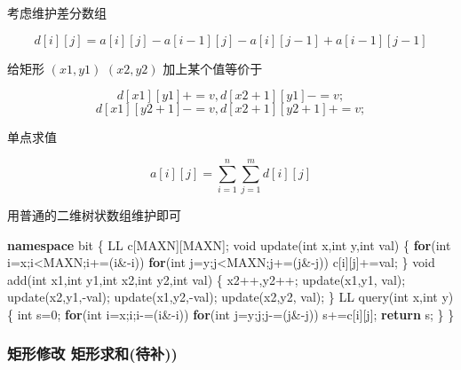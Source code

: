 \documentclass[
]{article}
\newenvironment{Shaded}{}{}
\newcommand{\ControlFlowTok}[1]{\textcolor[rgb]{0.00,0.44,0.13}{\textbf{#1}}}
\newcommand{\DataTypeTok}[1]{\textcolor[rgb]{0.56,0.13,0.00}{#1}}
\newcommand{\DecValTok}[1]{\textcolor[rgb]{0.25,0.63,0.44}{#1}}
\newcommand{\KeywordTok}[1]{\textcolor[rgb]{0.00,0.44,0.13}{\textbf{#1}}}
\newcommand{\NormalTok}[1]{#1}
\begin{document}
考虑维护差分数组

\[
d[i][j]=a[i][j]-a[i-1][j]-a[i][j-1]+a[i-1][j-1]
\]

给矩形 \((x1,y1)\) \((x2,y2)\) 加上某个值等价于

\[d[x1][y1]+=v,d[x2+1][y1]-=v;\] \[d[x1][y2+1]-=v,d[x2+1][y2+1]+=v;\]

单点求值

\[a[i][j]=\sum_{i=1}^{n}\sum_{j=1}^{m}d[i][j]\]

用普通的二维树状数组维护即可

\begin{Shaded}
\begin{Highlighting}[]
\KeywordTok{namespace}\NormalTok{ bit}
\NormalTok{\{}
\NormalTok{    LL c[MAXN][MAXN];}
    \DataTypeTok{void}\NormalTok{ update(}\DataTypeTok{int}\NormalTok{ x,}\DataTypeTok{int}\NormalTok{ y,}\DataTypeTok{int}\NormalTok{ val)}
\NormalTok{    \{}
        \ControlFlowTok{for}\NormalTok{(}\DataTypeTok{int}\NormalTok{ i=x;i\textless{}MAXN;i+=(i\&{-}i))}
            \ControlFlowTok{for}\NormalTok{(}\DataTypeTok{int}\NormalTok{ j=y;j\textless{}MAXN;j+=(j\&{-}j))}
\NormalTok{                c[i][j]+=val;}
\NormalTok{    \}}
    \DataTypeTok{void}\NormalTok{ add(}\DataTypeTok{int}\NormalTok{ x1,}\DataTypeTok{int}\NormalTok{ y1,}\DataTypeTok{int}\NormalTok{ x2,}\DataTypeTok{int}\NormalTok{ y2,}\DataTypeTok{int}\NormalTok{ val)}
\NormalTok{    \{}
\NormalTok{        x2++,y2++;}
\NormalTok{        update(x1,y1, val);}
\NormalTok{        update(x2,y1,{-}val);}
\NormalTok{        update(x1,y2,{-}val);}
\NormalTok{        update(x2,y2, val);}
\NormalTok{    \}}
\NormalTok{    LL query(}\DataTypeTok{int}\NormalTok{ x,}\DataTypeTok{int}\NormalTok{ y)}
\NormalTok{    \{}
        \DataTypeTok{int}\NormalTok{ s=}\DecValTok{0}\NormalTok{;}
        \ControlFlowTok{for}\NormalTok{(}\DataTypeTok{int}\NormalTok{ i=x;i;i{-}=(i\&{-}i))}
            \ControlFlowTok{for}\NormalTok{(}\DataTypeTok{int}\NormalTok{ j=y;j;j{-}=(j\&{-}j))}
\NormalTok{                s+=c[i][j];}
        \ControlFlowTok{return}\NormalTok{ s;}
\NormalTok{    \}}
\NormalTok{\}}
\end{Highlighting}
\end{Shaded}

\hypertarget{ux77e9ux5f62ux4feeux6539-ux77e9ux5f62ux6c42ux548cux5f85ux8865}{%
\subsubsection{矩形修改
矩形求和(待补))}\label{ux77e9ux5f62ux4feeux6539-ux77e9ux5f62ux6c42ux548cux5f85ux8865}}
\end{document}
